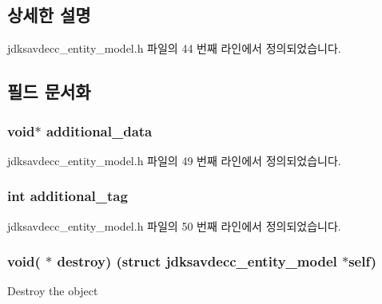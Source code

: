 \subsection{상세한 설명}


jdksavdecc\+\_\+entity\+\_\+model.\+h 파일의 44 번째 라인에서 정의되었습니다.



\subsection{필드 문서화}
\subsubsection[{\texorpdfstring{additional\+\_\+data}{additional_data}}]{\setlength{\rightskip}{0pt plus 5cm}void$\ast$ additional\+\_\+data}\hypertarget{structjdksavdecc__entity__model_a9744be07fcadb5e1e549b48913177d3f}{}\label{structjdksavdecc__entity__model_a9744be07fcadb5e1e549b48913177d3f}


jdksavdecc\+\_\+entity\+\_\+model.\+h 파일의 49 번째 라인에서 정의되었습니다.

\subsubsection[{\texorpdfstring{additional\+\_\+tag}{additional_tag}}]{\setlength{\rightskip}{0pt plus 5cm}int additional\+\_\+tag}\hypertarget{structjdksavdecc__entity__model_ad195f108811d5b920d025b7b2b7b5859}{}\label{structjdksavdecc__entity__model_ad195f108811d5b920d025b7b2b7b5859}


jdksavdecc\+\_\+entity\+\_\+model.\+h 파일의 50 번째 라인에서 정의되었습니다.

\subsubsection[{\texorpdfstring{destroy}{destroy}}]{\setlength{\rightskip}{0pt plus 5cm}void( $\ast$ destroy) (struct {\bf jdksavdecc\+\_\+entity\+\_\+model} $\ast$self)}\hypertarget{structjdksavdecc__entity__model_a83266578e7f9c16e098f9ad918b47036}{}\label{structjdksavdecc__entity__model_a83266578e7f9c16e098f9ad918b47036}
Destroy the object 

